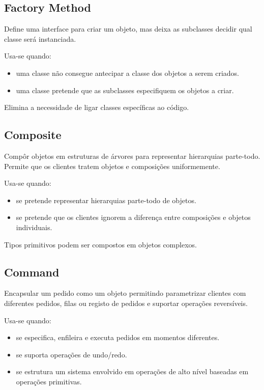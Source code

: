 \documentclass[../resumosLPOO.tex]{subfiles}
\begin{document}
 

\subsection{Factory Method}

Define uma interface para criar um objeto, mas deixa as subclasses decidir qual classe será instanciada.

Usa-se quando:
\begin{itemize}
    \item uma classe não consegue antecipar a classe dos objetos a serem criados.
    \item uma classe pretende que as subclasses especifiquem os objetos a criar.
\end{itemize}

Elimina a necessidade de ligar classes específicas ao código.


\subsection{Composite}

Compôr objetos em estruturas de árvores para representar hierarquias parte-todo. Permite que os clientes tratem objetos e composições uniformemente.

Usa-se quando:
\begin{itemize}
    \item se pretende representar hierarquias parte-todo de objetos.
    \item se pretende que os clientes ignorem a diferença entre composições e objetos individuais.
\end{itemize}

Tipos primitivos podem ser compostos em objetos complexos.

\subsection{Command}

Encapsular um pedido como um objeto permitindo parametrizar clientes com diferentes pedidos, filas ou registo de pedidos e suportar operações reversíveis. 

Usa-se quando:
\begin{itemize}
    \item se especifica, enfileira e executa pedidos em momentos diferentes.
    \item se suporta operações de undo/redo.
    \item se estrutura um sistema envolvido em operações de alto nível baseadas em operações primitivas.
\end{itemize}
\end{document}

